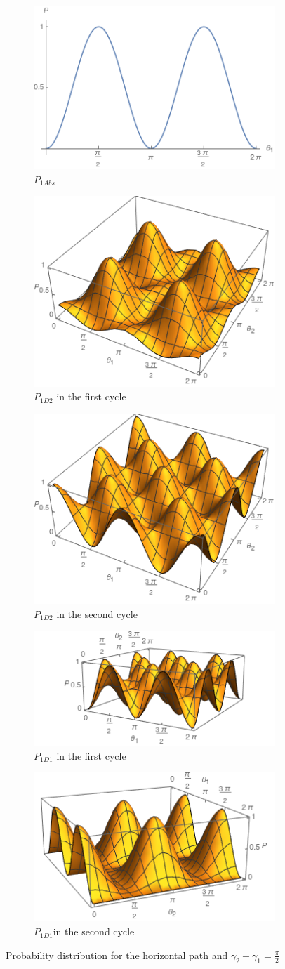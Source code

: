 \documentclass[12pt]{book}
\begin{document}
\begin{figure}[h!]
\centering
\begin{subfigure}[b]{0.35\linewidth}
\includegraphics[width=\linewidth,height=3 cm]{images/Pc1Abs.png}
\caption{$P_{1Abs}$}
\label{fig:BS1}
\end{subfigure}
\begin{subfigure}[b]{0.35\linewidth}
\includegraphics[width=\linewidth,height=3 cm]{images/Pc1D21.png}
\caption{$P_{1D2}$ in the first cycle }
\label{fig:BS1}
\end{subfigure}
\begin{subfigure}[b]{0.35\linewidth}
\includegraphics[width=\linewidth,height=3 cm]{images/Pc1D22.png}
\caption{$P_{1D2}$ in the second cycle}
\label{fig:BS1}
\end{subfigure}
\begin{subfigure}[b]{0.35\linewidth}
\includegraphics[width=\linewidth,height=3 cm]{images/Pc1D11.png}
\caption{$P_{1D1} $ in the first cycle}
\label{fig:westminster_aerea}
\end{subfigure}
\begin{subfigure}[b]{0.35\linewidth}
\includegraphics[width=\linewidth,height=3 cm]{images/Pc1D12.png}
\caption{$P_{1D1} $in the second cycle }
\label{fig:BS1}
\end{subfigure}
\caption{Probability distribution for the horizontal path and  $\gamma_{2}-\gamma_{1}=\frac{\pi}{2}$}
\label{fig:westminster}
\end{figure}
\end{document}
